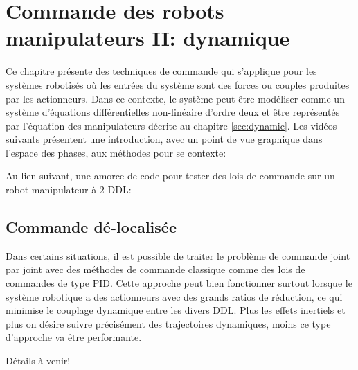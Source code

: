 \chapter{Commande des robots manipulateurs II: dynamique}
\label{sec:robotcontroldynamic}

Ce chapitre présente des techniques de commande qui s'applique pour les systèmes robotisés où les entrées du système sont des forces ou couples produites par les actionneurs. Dans ce contexte, le système peut être modéliser comme un système d'équations différentielles non-linéaire d'ordre deux et être représentés par l'équation des manipulateurs décrite au chapitre \ref{sec:dynamic}.  Les vidéos suivants présentent une introduction, avec un point de vue graphique dans l'espace des phases, aux méthodes pour se contexte:


Au lien suivant, une amorce de code pour tester des lois de commande sur un robot manipulateur à 2 DDL:




\newpage
\section{Commande dé-localisée}

Dans certains situations, il est possible de traiter le problème de commande joint par joint avec des méthodes de commande classique comme des lois de commandes de type PID. Cette approche peut bien fonctionner surtout lorsque le système robotique a des actionneurs avec des grands ratios de réduction, ce qui minimise le couplage dynamique entre les divers DDL. Plus les effets inertiels et plus on désire suivre précisément des trajectoires dynamiques, moins ce type d'approche va être performante.


Détails à venir!


\newpage
